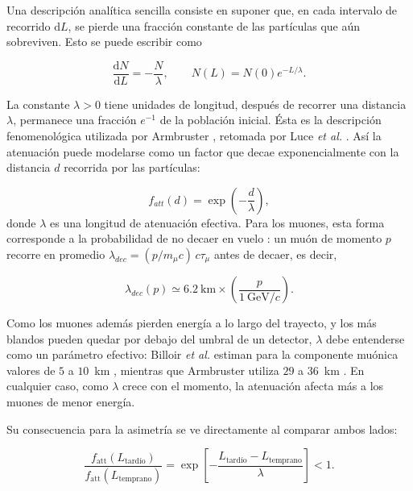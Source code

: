 Una descripción analítica sencilla consiste en suponer que, en cada intervalo de recorrido $\mathrm dL$, se pierde una fracción constante de las partículas que aún sobreviven. Esto se puede escribir como

\begin{equation}
	\frac{\mathrm dN}{\mathrm dL}=-\frac{N}{\lambda},
	\qquad
	N(L)=N(0)e^{-L/\lambda}.
	\nonumber
\end{equation}

La constante $\lambda>0$ tiene unidades de longitud, después de recorrer una distancia $\lambda$, permanece una fracción $e^{-1}$ de la población inicial. Ésta es la descripción fenomenológica utilizada por Armbruster \cite{Armbruster2018}, retomada por Luce \textit{et al.} \cite{Luce_ICRC2021}. Así la atenuación puede modelarse como un factor que decae exponencialmente con la distancia $d$ recorrida por las partículas:

\begin{equation}
	f_{att}(d) = \exp\left(-\frac{d}{\lambda}\right),
	\label{eq:atenuacion_armbruster}
\end{equation}
%
donde $\lambda$ es una longitud de atenuación efectiva. Para los muones, esta forma corresponde a la probabilidad de no decaer en vuelo \cite{Cazon2012}: un muón de momento $p$ recorre en promedio $\lambda_{dec} = (p/m_\mu c)\,c\tau_\mu$ antes de decaer, es decir,

\begin{equation}
	\lambda_{dec}(p) \simeq 6.2~\text{km}\times\left(\frac{p}{1~\mathrm{GeV}/c}\right).
	\label{eq:lambda_decaimiento}
\end{equation}

Como los muones además pierden energía a lo largo del trayecto, y los más blandos pueden quedar por debajo del umbral de un detector, $\lambda$ debe entenderse como un parámetro efectivo: Billoir \textit{et al.} estiman para la componente muónica valores de $5$ a $10$~km \cite{Billoir2002b}, mientras que Armbruster utiliza $29$ a $36$~km \cite{Armbruster2018}. En cualquier caso, como $\lambda$ crece con el momento, la atenuación afecta más a los muones de menor energía.

Su consecuencia para la asimetría se ve directamente al comparar ambos lados:

\begin{equation}
	\frac{f_{\mathrm{att}}(L_{\text{tardío}})}
	{f_{\mathrm{att}}(L_{\mathrm{temprano}})}
	=\exp\!\left[-\frac{L_{\text{tardío}}-L_{\mathrm{temprano}}}{\lambda}\right]<1.
	\label{eq:comparacion_atenuacion}
\end{equation}

